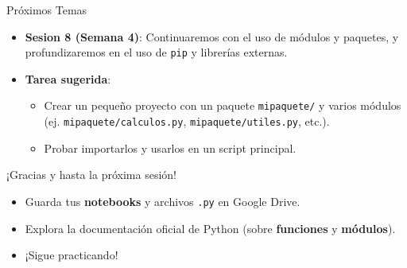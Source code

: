 \documentclass[10pt]{beamer}
\begin{document}
\begin{frame}{Próximos Temas}
  \begin{itemize}
    \item \textbf{Sesion 8 (Semana 4)}: Continuaremos con el uso de módulos y paquetes, y profundizaremos en el uso de \texttt{pip} y librerías externas.
    \item \textbf{Tarea sugerida}:
      \begin{itemize}
        \item Crear un pequeño proyecto con un paquete \texttt{mipaquete/} y varios módulos (ej. \texttt{mipaquete/calculos.py}, \texttt{mipaquete/utiles.py}, etc.).
        \item Probar importarlos y usarlos en un script principal.
      \end{itemize}
  \end{itemize}
\end{frame}

\begin{frame}
  \huge{\centerline{¡Gracias y hasta la próxima sesión!}}
  \vspace{0.5cm}
  \normalsize
  \begin{itemize}
    \item Guarda tus \textbf{notebooks} y archivos \texttt{.py} en Google Drive.
    \item Explora la documentación oficial de Python (sobre \textbf{funciones} y \textbf{módulos}).
    \item ¡Sigue practicando!
  \end{itemize}
\end{frame}
\end{document}
